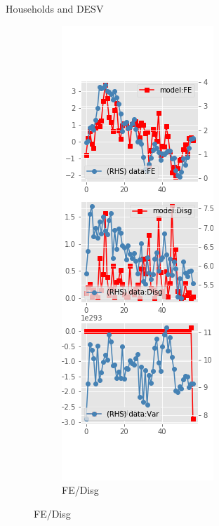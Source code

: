 \documentclass{beamer}
\begin{document}
\begin{frame}{Households and DESV}
\begin{figure}[ht]
\begin{subfigure}[b]{0.2\textwidth}
		\end{subfigure}
		\hfill
		\begin{subfigure}[b]{0.2\textwidth}
			\caption{FE/Disg}
			\includegraphics[width=\textwidth, height = 0.8\textheight]{figuresDraft/sce_de_est_sv_diag1.png}

\end{subfigure}
\end{figure}
\end{frame}
\end{document}
